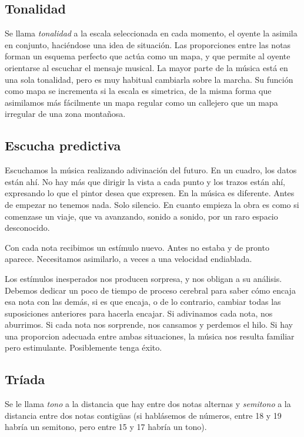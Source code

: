 \documentclass[]{article}
\begin{document}
\subsection{Tonalidad}

Se llama \emph{tonalidad} a la escala seleccionada en cada momento, el oyente la asimila en conjunto, haciéndose una idea de situación. Las proporciones entre las notas forman un esquema perfecto que actúa como un mapa, y que permite al oyente orientarse al escuchar el mensaje musical. La mayor parte de la música está en una sola tonalidad, pero es muy habitual cambiarla sobre la marcha. Su función como mapa se incrementa si la escala es simetrica, de la misma forma que asimilamos más fácilmente un mapa regular como un callejero que un mapa irregular de una zona montañosa.

\subsection{Escucha predictiva}

Escuchamos la música realizando adivinación del futuro. En un cuadro, los datos están ahí. No hay más que dirigir la vista a cada punto y los trazos están ahí, expresando lo que el pintor desea que expresen. En la música es diferente. Antes de empezar no tenemos nada. Solo silencio. En cuanto empieza la obra es como si comenzase un viaje, que va avanzando, sonido a sonido, por un raro espacio desconocido.

Con cada nota recibimos un estímulo nuevo. Antes no estaba y de pronto aparece. Necesitamos asimilarlo, a veces a una velocidad endiablada.

Los estímulos inesperados nos producen sorpresa, y nos obligan a su análisis. Debemos dedicar un poco de tiempo de proceso cerebral para saber cómo encaja esa nota con las demás, si es que encaja, o de lo contrario, cambiar todas las suposiciones anteriores para hacerla encajar. Si adivinamos cada nota, nos aburrimos. Si cada nota nos sorprende, nos cansamos y perdemos el hilo. Si hay una proporcion adecuada entre ambas situaciones, la música nos resulta familiar pero estimulante. Posiblemente tenga éxito.

\subsection{Tríada}

Se le llama \emph{tono} a la distancia que hay entre dos notas alternas y \emph{semitono} a la distancia entre dos notas contigüas (si hablásemos de números, entre 18 y 19 habría un semitono, pero entre 15 y 17 habría un tono).
\end{document}

